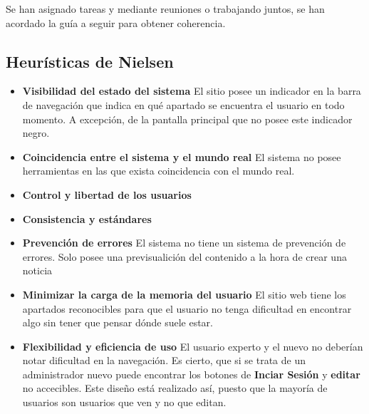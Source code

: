 \documentclass[10pt, spanish, pdftex]{template/UC3M_document}
\begin{document}
Se han asignado tareas y mediante reuniones o trabajando juntos, se han acordado la guía a seguir para obtener coherencia.


\subsection{Heurísticas de Nielsen}
  \begin{itemize}
    \item \textbf{Visibilidad del estado del sistema}
    El sitio posee un indicador en la barra de navegación que indica en qué apartado se encuentra el usuario en todo momento. A excepción, de la pantalla principal que no posee este indicador negro.

    \item \textbf{Coincidencia entre el sistema y el mundo real}
    El sistema no posee herramientas en las que exista coincidencia con el mundo real.

    \item \textbf{Control y libertad de los usuarios}

    \item \textbf{Consistencia y estándares}

    \item \textbf{Prevención de errores}
    El sistema no tiene un sistema de prevención de errores. Solo posee una previsualición del contenido a la hora de crear una noticia

    \item \textbf{Minimizar la carga de la memoria del usuario}
    El sitio web tiene los apartados reconocibles para que el usuario no tenga dificultad en encontrar algo sin tener que pensar dónde suele estar.

    \item \textbf{Flexibilidad y eficiencia de uso}
    El usuario experto y el nuevo no deberían notar dificultad en la navegación. Es cierto, que si se trata de un administrador nuevo puede encontrar los botones de \textbf{Inciar Sesión} y \textbf{editar} no accecibles. Este diseño está realizado así, puesto que la mayoría de usuarios son usuarios que ven y no que editan.


\end{itemize}
\end{document}
